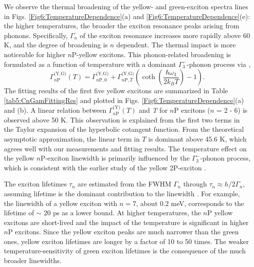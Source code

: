 \documentclass[aps,reprint,amsmath,amssymb,prb]{revtex4-1}
\begin{document}
We observe the thermal broadening of the yellow- and green-exciton spectra lines in Figs. \ref{Fig6:TemperatureDependence}(a) and \ref{Fig6:TemperatureDependence}(e): the higher temperatures, the broader the exciton resonance peaks arising from phonons. Specifically, $\Gamma_n$ of the exciton resonance increases more rapidly above 60 K, and the degree of broadening is $n$ dependent. The thermal impact is more noticeable for higher $n$P-yellow excitons. This phonon-related broadening is formulated as a function of temperature with a dominant $\Gamma_3^-$-phonon process via \cite{Itoh1975},
\begin{equation}\label{eq:Gamma}
\Gamma_{n\text{P}}^{\text{(Y,G)}}(T) 
= \Gamma_{n\text{P} ,0}^{\text{(Y,G)}}+\Gamma_{n\text{P}, T}^{\text{(Y,G)}}\left( \operatorname{coth}\left(\frac{\hbar \omega_3}{2 k_B T}\right)-1\right).
\end{equation}
The fitting results of the first five yellow excitons are summarized in Table \ref{tab5:CnGamFittingRes} and plotted in Figs. \ref{Fig6:TemperatureDependence}(a) and (b). A linear relation between $\Gamma_{n\text{P}}^{\text{(Y)}}(T)$ and \textit{T} for $n$P excitons ($n$ = 2 - 6) is observed above 50 K. This observation is explained from the first two terms in the Taylor expansion of the hyperbolic cotangent function. From the theoretical asymptotic approximation, the linear term in $T$ is dominant above 45.6 K, which agrees well with our measurements and fitting results. The temperature effect on the yellow $n$P-exciton linewidth is primarily influenced by the $\Gamma_3^-$-phonon process, which is consistent with the earlier study of the yellow 2P-exciton \cite{Itoh1975}. 

The exciton lifetimes $\tau_n$ are estimated from the FWHM $\Gamma_n$ through $\tau_{n} \approx h/2\Gamma_n$, assuming lifetime is the dominant contribution to the linewidth {\cite{Kazimierczuk2014}}. For example, the linewidth of a yellow exciton with $n=7$, about 0.2 meV, corresponds to the lifetime of $\sim$ 20 ps as a lower bound.  At higher temperatures, the $n$P yellow excitons are short-lived and the impact of the temperature is significant in higher $n$P excitons. 
Since the yellow exciton peaks are much narrower than the green ones, yellow exciton lifetimes are longer by a factor of 10 to 50 times. The weaker temperature-sensitivity of green exciton lifetimes is the consequence of the much broader linewidths. 
\end{document}

